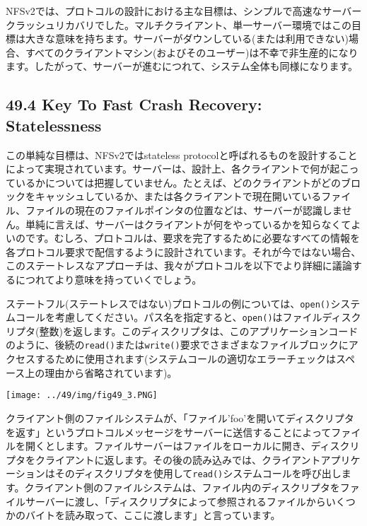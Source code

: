 NFSv2では、プロトコルの設計における主な目標は、シンプルで高速なサーバークラッシュリカバリでした。マルチクライアント、単一サーバー環境ではこの目標は大きな意味を持ちます。サーバーがダウンしている(または利用できない)場合、すべてのクライアントマシン(およびそのユーザー)は不幸で非生産的になります。したがって、サーバーが進むにつれて、システム全体も同様になります。

\hypertarget{key-to-fast-crash-recovery-statelessness}{%
\subsection*{49.4 Key To Fast Crash Recovery:
Statelessness}\label{key-to-fast-crash-recovery-statelessness}}

この単純な目標は、NFSv2ではstateless
protocolと呼ばれるものを設計することによって実現されています。サーバーは、設計上、各クライアントで何が起こっているかについては把握していません。たとえば、どのクライアントがどのブロックをキャッシュしているか、または各クライアントで現在開いているファイル、ファイルの現在のファイルポインタの位置などは、サーバーが認識しません。単純に言えば、サーバーはクライアントが何をやっているかを知らなくてよいのです。むしろ、プロトコルは、要求を完了するために必要なすべての情報を各プロトコル要求で配信するように設計されています。それが今ではない場合、このステートレスなアプローチは、我々がプロトコルを以下でより詳細に議論するにつれてより意味を持っていくでしょう。

ステートフル(ステートレスではない)プロトコルの例については、\texttt{open()}システムコールを考慮してください。パス名を指定すると、\texttt{open()}はファイルディスクリプタ(整数)を返します。このディスクリプタは、このアプリケーションコードのように、後続の\texttt{read()}または\texttt{write()}要求でさまざまなファイルブロックにアクセスするために使用されます(システムコールの適切なエラーチェックはスペース上の理由から省略されています)。

\texttt{[image: ../49/img/fig49\_3.PNG]}

クライアント側のファイルシステムが、「ファイル'foo'を開いてディスクリプタを返す」というプロトコルメッセージをサーバーに送信することによってファイルを開くとします。ファイルサーバーはファイルをローカルに開き、ディスクリプタをクライアントに返します。その後の読み込みでは、クライアントアプリケーションはそのディスクリプタを使用して\texttt{read()}システムコールを呼び出します。クライアント側のファイルシステムは、ファイル内のディスクリプタをファイルサーバーに渡し、「ディスクリプタによって参照されるファイルからいくつかのバイトを読み取って、ここに渡します」と言っています。

